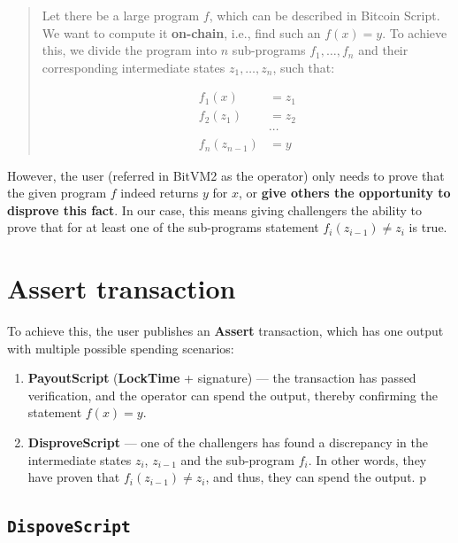 \documentclass{iacrtrans}
\begin{document}
\begin{quote}
  Let there be a large program \(f\), which can be described in
  Bitcoin Script. We want to compute it \textbf{on-chain}, i.e., find
  such an \(f(x) = y\). To achieve this, we divide the program into
  \(n\) sub-programs \(f_1, \ldots, f_n\) and their corresponding
  intermediate states \(z_1, \ldots, z_n\), such that:

  \begin{equation}
    \begin{aligned}
      f_1(x) &= z_1 \\
      f_2(z_1) &= z_2 \\
      &\cdots \\
      f_n(z_{n-1}) &= y
    \end{aligned}
  \end{equation}
\end{quote}

However, the user (referred in BitVM2 as the operator) only needs to
prove that the given program \(f\) indeed returns \(y\) for \(x\), or
\textbf{give others the opportunity to disprove this fact}. In our
case, this means giving challengers the ability to prove that for at
least one of the sub-programs statement \(f_i(z_{i-1}) \neq z_i\) is
true.

\section{\textbf{Assert} transaction}\label{sec:assert-tx}

To achieve this, the user publishes an \textbf{Assert} transaction,
which has one output with multiple possible spending scenarios:

\begin{enumerate}
  \item \textbf{PayoutScript} (\textbf{LockTime} + signature) --- the
    transaction has passed verification, and the operator can spend the
    output, thereby confirming the statement \(f(x) = y\).
  \item \textbf{DisproveScript} --- one of the challengers has found a
    discrepancy in the intermediate states \(z_i\), \(z_{i-1}\) and the
    sub-program \(f_i\). In other words, they have proven that
    \(f_i(z_{i-1}) \neq z_i\), and thus, they can spend the output.
    p
\end{enumerate}

\subsection{\texttt{DispoveScript}}\label{sec:dispove-script}
\end{document}
